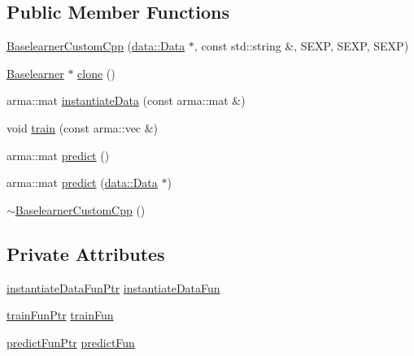 \subsection*{Public Member Functions}
\begin{DoxyCompactItemize}
\item 
\mbox{\hyperlink{classblearner_1_1_baselearner_custom_cpp_a7714c44164d0f763a861217ff2d53480}{Baselearner\+Custom\+Cpp}} (\mbox{\hyperlink{classdata_1_1_data}{data\+::\+Data}} $\ast$, const std\+::string \&, S\+E\+XP, S\+E\+XP, S\+E\+XP)
\item 
\mbox{\hyperlink{classblearner_1_1_baselearner}{Baselearner}} $\ast$ \mbox{\hyperlink{classblearner_1_1_baselearner_custom_cpp_a8478407ac4d8ed118fd1381f65df150a}{clone}} ()
\item 
arma\+::mat \mbox{\hyperlink{classblearner_1_1_baselearner_custom_cpp_ae130d3b469eff32c8e0be12d925cf88f}{instantiate\+Data}} (const arma\+::mat \&)
\item 
void \mbox{\hyperlink{classblearner_1_1_baselearner_custom_cpp_a7437b1175498b928d3202b586527d2c4}{train}} (const arma\+::vec \&)
\item 
arma\+::mat \mbox{\hyperlink{classblearner_1_1_baselearner_custom_cpp_a88c17ed1e32255e482f34695e06e7d25}{predict}} ()
\item 
arma\+::mat \mbox{\hyperlink{classblearner_1_1_baselearner_custom_cpp_a55fb45a929fea01f79fa3dcad7698174}{predict}} (\mbox{\hyperlink{classdata_1_1_data}{data\+::\+Data}} $\ast$)
\item 
\mbox{\hyperlink{classblearner_1_1_baselearner_custom_cpp_a67aa938d71013c6e931d3edc563935bb}{$\sim$\+Baselearner\+Custom\+Cpp}} ()
\end{DoxyCompactItemize}
\subsection*{Private Attributes}
\begin{DoxyCompactItemize}
\item 
\mbox{\hyperlink{namespaceblearner_a10cec16134a934fb9defbdc2c2011f2a}{instantiate\+Data\+Fun\+Ptr}} \mbox{\hyperlink{classblearner_1_1_baselearner_custom_cpp_ab8d8e9a2bc502286ad1cd1ea5e646270}{instantiate\+Data\+Fun}}
\item 
\mbox{\hyperlink{namespaceblearner_a5e2b38edf05e32681bee136af9ae505d}{train\+Fun\+Ptr}} \mbox{\hyperlink{classblearner_1_1_baselearner_custom_cpp_ab04bffb15f84320d325821edb97ef9f5}{train\+Fun}}
\item 
\mbox{\hyperlink{namespaceblearner_a93d5b51440d434704d2bde9dee652f6e}{predict\+Fun\+Ptr}} \mbox{\hyperlink{classblearner_1_1_baselearner_custom_cpp_aa5f2ac8345bddaf143d47d7c88e993c5}{predict\+Fun}}
\end{DoxyCompactItemize}
